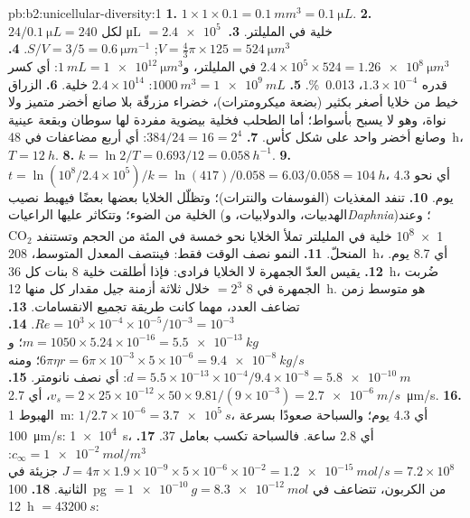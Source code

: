 \begin{solution}{pb:b2:unicellular-diversity:1}
\textbf{1.} $1\times 1\times 0.1 = \qty{0.1}{mm^3} = \qty{0.1}{\micro L}$.
\textbf{2.} $24/\qty{0.1}{\micro L} = 240$ لكل \unit{\micro L} $=
\qty{2.4e5}{}$ خلية في المليلتر.
\textbf{3.} $V = \tfrac{4}{3}\pi\times 125 = \qty{524}{\micro m^3}$;
$S/V = 3/5 = \qty{0.6}{\micro m^{-1}}$.
\textbf{4.} $2.4\times 10^5\times 524 = \qty{1.26e8}{\micro m^3}$ في
المليلتر، و$\qty{1}{mL} = \qty{1e12}{\micro m^3}$: أي كسر قدره
$1.3\times 10^{-4}$، \qty{0.013}{\%}.
\textbf{5.} $\qty{1000}{m^3} = \qty{1e9}{mL}$: $2.4\times 10^{14}$
خلية.
\textbf{6.} الزراق خيط من خلايا أصغر بكثير (بضعة ميكرومترات)،
خضراء مزرقّة بلا صانع أخضر متميز ولا نواة، وهو لا يسبح بأسواط؛ أما
الطحلب فخلية بيضوية مفردة لها سوطان وبقعة عينية وصانع أخضر واحد على
شكل كأس.
\textbf{7.} $384/24 = 16 = 2^4$: أي أربع مضاعفات في \qty{48}{h}،
$T = \qty{12}{h}$.
\textbf{8.} $k = \ln 2/T = 0.693/12 = \qty{0.058}{h^{-1}}$.
\textbf{9.} $t = \ln(10^8/2.4\times 10^5)/k = \ln(417)/0.058 =
6.03/0.058 = \qty{104}{h}$، أي نحو 4.3 يوم.
\textbf{10.} تنفد المغذيات (الفوسفات والنترات)؛ وتظلّل الخلايا
بعضها بعضًا فيهبط نصيب الخلية من الضوء؛ وتتكاثر عليها الراعيات
(الهدبيات، والدولابيات، و\emph{Daphnia})؛ وعند \qty{1e8}{} خلية في
المليلتر تملأ الخلايا نحو خمسة في المئة من الحجم وتستنفد
$\mathrm{CO_2}$ المنحلّ.
\textbf{11.} النمو نصف الوقت فقط: فينتصف المعدل المتوسط،
\qty{208}{h}، أي 8.7 يوم.
\textbf{12.} يقيس العدّ الجمهرة لا الخلايا فرادى: فإذا أطلقت خلية 8
بنات كل \qty{36}{h}، ضُربت الجمهرة في 8 $= 2^3$ خلال ثلاثة أزمنة
جيل مقدار كل منها \qty{12}{h}.  هو متوسط زمن تضاعف العدد،
مهما كانت طريقة تجميع الانقسامات.
\textbf{13.} $Re = 10^3\times 10^{-4}\times 10^{-5}/10^{-3} = 10^{-3}$.
\textbf{14.} $m = 1050\times 5.24\times 10^{-16} = \qty{5.5e-13}{kg}$؛
و$6\pi\eta r = 6\pi\times 10^{-3}\times 5\times 10^{-6} =
\qty{9.4e-8}{kg/s}$؛ ومنه $d = 5.5\times 10^{-13}\times 10^{-4}/9.4\times
10^{-8} = \qty{5.8e-10}{m}$: أي نصف نانومتر.
\textbf{15.} $v_s = 2\times 25\times 10^{-12}\times 50\times
9.81/(9\times 10^{-3}) = \qty{2.7e-6}{m/s}$، أي \qty{2.7}{\micro m/s}.
\textbf{16.} الهبوط \qty{1}{m}: $1/2.7\times 10^{-6} =
\qty{3.7e5}{s}$، أي 4.3 يوم؛ والسباحة صعودًا بسرعة \qty{100}{\micro m/s}:
\qty{1e4}{s}، أي 2.8 ساعة. فالسباحة تكسب بعامل 37.
\textbf{17.} $c_\infty = \qty{1e-2}{mol/m^3}$: $J = 4\pi\times
1.9\times 10^{-9}\times 5\times 10^{-6}\times 10^{-2} =
\qty{1.2e-15}{mol/s} = 7.2\times 10^8$ جزيئة في الثانية.
\textbf{18.} \qty{100}{pg} $= \qty{1e-10}{g} = \qty{8.3e-12}{mol}$ من
الكربون، تتضاعف في \qty{12}{h} $= \qty{43200}{s}$:

\end{solution}
